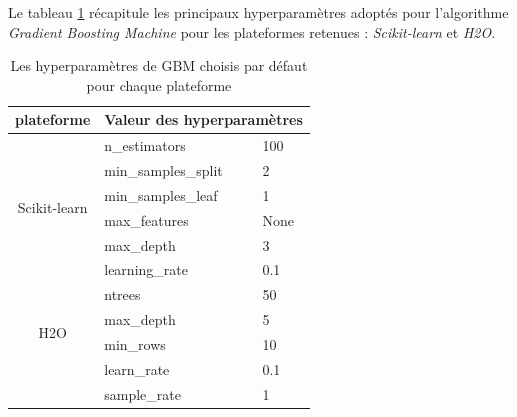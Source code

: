 \begin{itemize}
    Le tableau  \ref{tab:GBM} récapitule les principaux hyperparamètres adoptés pour l'algorithme \textit{Gradient Boosting Machine} pour les plateformes retenues : \textit{Scikit-learn} et \textit{H2O}.\\
        \begin{table}[h!]
        \centering
        \begin{tabular}{|c||p{8cm}p{2cm}|}
        \hline
        plateforme & \multicolumn{2}{|c|}{Valeur des hyperparamètres}  \\ \hline
        \multirow{6}{*}{Scikit-learn} 
        & n\_estimators & 100  \\
        & min\_samples\_split & 2  \\ 
        & min\_samples\_leaf & 1 \\
        & max\_features & None\\
        & max\_depth & 3\\
        & learning\_rate  & 0.1\\
         \hline
        \multirow{4}{*}{H2O} 
        & ntrees & 50  \\
        & max\_depth & 5\\
        & min\_rows & 10  \\ 
        & learn\_rate & 0.1 \\
        & sample\_rate & 1 \\
         \hline
        \end{tabular}
        \caption{Les hyperparamètres de GBM choisis par défaut pour chaque plateforme}
        \label{tab:GBM}
        \end{table}
        

\end{itemize}
